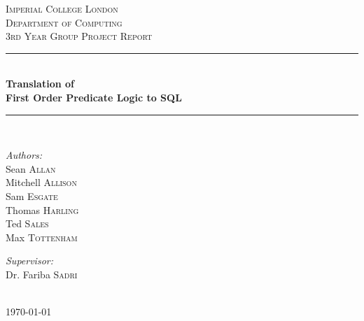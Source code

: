 \documentclass[a4paper, 11pt]{article}
\begin{document}
\begin{titlepage}

\newcommand{\HRule}{\rule{\linewidth}{0.5mm}} %

\center

\textsc{\LARGE Imperial College London}\\[1.5cm]
\textsc{\Large Department of Computing}\\[0.5cm]
\textsc{\large 3rd Year Group Project Report}\\[0.5cm]

\HRule \\[0.4cm]
{\huge \bfseries Translation of}\\[0.4cm]
{\huge \bfseries First Order Predicate Logic to SQL}\\[0.4cm]%
\HRule \\[1.5cm]

\begin{minipage}[t]{0.4\textwidth}
  \begin{flushleft} \large
    \emph{Authors:}\\
    Sean \textsc{Allan}\\
    Mitchell \textsc{Allison}\\
    Sam \textsc{Esgate}\\
    Thomas \textsc{Harling}\\
    Ted \textsc{Sales}\\
    Max \textsc{Tottenham}
  \end{flushleft}
\end{minipage}%
%
\begin{minipage}[t]{0.4\textwidth}
  \begin{flushright} \large
    \emph{Supervisor:} \\
    Dr. Fariba \textsc{Sadri}  %
  \end{flushright}
\end{minipage}%
\\[4cm]

{\large \today}\\[3cm] %

\vfill %

\end{titlepage}

\renewcommand{\contentsname}{\huge Contents \vspace{1cm}}
\tableofcontents
\clearpage
\end{document}
